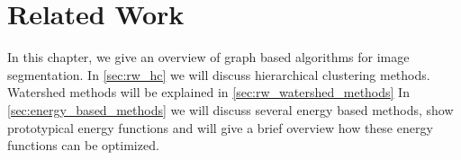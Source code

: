 \chapter{Related Work} \label{ch:reated_work}

In this chapter, we give an overview of graph based algorithms
for image segmentation.
In \cref{sec:rw_hc} we will discuss hierarchical clustering 
methods.
Watershed methods will be explained in \cref{sec:rw_watershed_methods}
In \cref{sec:energy_based_methods} we will discuss
several energy based methods, show prototypical energy functions and
will give a brief overview how these energy functions can
be optimized.




% 

 

 

 

% 

% 





